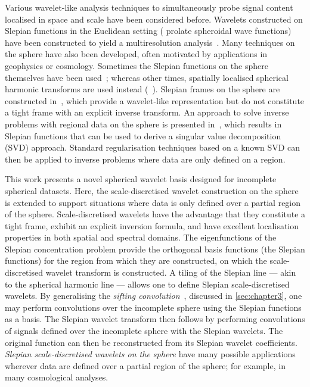 Various wavelet-like analysis techniques to simultaneously probe signal content localised in space and scale have been considered before.
Wavelets constructed on Slepian functions in the Euclidean setting (\ie{} prolate spheroidal wave functions) have been constructed to yield a multiresolution analysis~\autocite{Walter2004}.
Many techniques on the sphere have also been developed, often motivated by applications in geophysics or cosmology.
Sometimes the Slepian functions on the sphere themselves have been used~\autocite{Simons2009}; whereas other times, spatially localised spherical harmonic transforms are used instead (\eg{}~\autocite{Simons1997,Wieczorek2005,Khalid2013,Khalid2013a}).
Slepian frames on the sphere are constructed in~\autocite{Simons2011}, which provide a wavelet-like representation but do not constitute a tight frame with an explicit inverse transform.
An approach to solve inverse problems with regional data on the sphere is presented in~\autocite{Michel2017}, which results in Slepian functions that can be used to derive a singular value decomposition (SVD) approach.
Standard regularisation techniques based on a known SVD can then be applied to inverse problems where data are only defined on a region.

This work presents a novel spherical wavelet basis designed for incomplete spherical datasets.
Here, the scale-discretised wavelet construction on the sphere~\autocite{Wiaux2008,McEwen2018,Leistedt2013,McEwen2013,McEwen2015} is extended to support situations where data is only defined over a partial region of the sphere.
Scale-discretised wavelets have the advantage that they constitute a tight frame, exhibit an explicit inversion formula, and have excellent localisation properties in both spatial and spectral domains.
The eigenfunctions of the Slepian concentration problem provide the orthogonal basis functions (the Slepian functions) for the region from which they are constructed, on which the scale-discretised wavelet transform is constructed.
A tiling of the Slepian line --- akin to the spherical harmonic line --- allows one to define Slepian scale-discretised wavelets.
By generalising the \emph{sifting convolution}~\autocite{Roddy2021}, discussed in \cref{sec:chapter3}, one may perform convolutions over the incomplete sphere using the Slepian functions as a basis.
The Slepian wavelet transform then follows by performing convolutions of signals defined over the incomplete sphere with the Slepian wavelets.
The original function can then be reconstructed from its Slepian wavelet coefficients.
\emph{Slepian scale-discretised wavelets on the sphere} have many possible applications wherever data are defined over a partial region of the sphere; for example, in many cosmological analyses.

